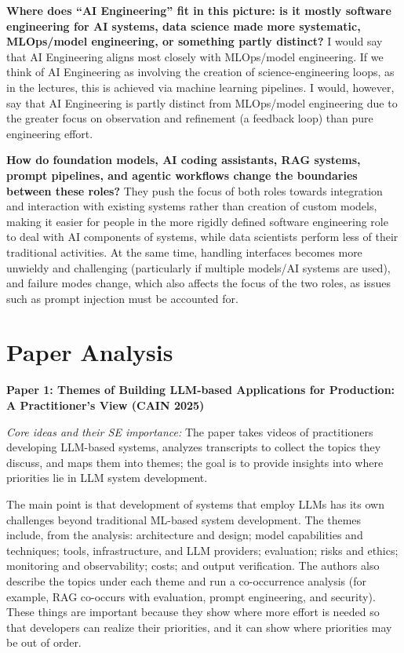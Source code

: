 \documentclass[11pt]{article}
\begin{document}
\textbf{Where does “AI Engineering” fit in this picture: is it mostly software engineering for AI systems,
data science made more systematic, MLOps/model engineering, or something
partly distinct?} I would say that AI Engineering aligns most closely with MLOps/model engineering. If we think of AI Engineering as involving the creation of science-engineering loops, as in the lectures, this is achieved via machine learning pipelines. I would, however, say that AI Engineering is partly distinct from MLOps/model engineering due to the greater focus on observation and refinement (a feedback loop) than pure engineering effort.

\textbf{How do foundation models, AI coding assistants, RAG systems,
prompt pipelines, and agentic workflows change the boundaries between these
roles?} They push the focus of both roles towards integration and interaction with existing systems rather than creation of custom models, making it easier for people in the more rigidly defined software engineering role to deal with AI components of systems, while data scientists perform less of their traditional activities. At the same time, handling interfaces becomes more unwieldy and challenging (particularly if multiple models/AI systems are used), and failure modes change, which also affects the focus of the two roles, as issues such as prompt injection must be accounted for.

\section{Paper Analysis}

\textbf{Paper 1: Themes of Building LLM-based Applications for Production: A Practitioner's View (CAIN 2025)}

\textit{Core ideas and their SE importance:} The paper takes videos of practitioners developing LLM-based systems, analyzes transcripts to collect the topics they discuss, and maps them into themes; the goal is to provide insights into where priorities lie in LLM system development.

The main point is that development of systems that employ LLMs has its own challenges beyond traditional ML-based system development. The themes include, from the analysis: architecture and design; model capabilities and techniques; tools, infrastructure, and LLM providers; evaluation; risks and ethics; monitoring and observability; costs; and output verification. The authors also describe the topics under each theme and run a co-occurrence analysis (for example, RAG co-occurs with evaluation, prompt engineering, and security). These things are important because they show where more effort is needed so that developers can realize their priorities, and it can show where priorities may be out of order.
\end{document}
